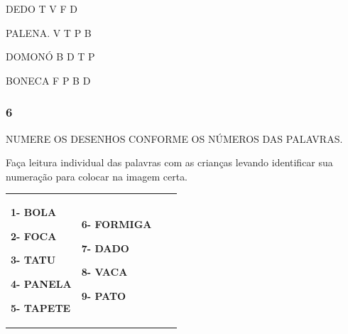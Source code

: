 DEDO T V F D

PALENA. V T P B

DOMONÓ B D T P

BONECA F P B D

\subsubsection{6 }\label{section-5}

NUMERE OS DESENHOS CONFORME OS NÚMEROS DAS PALAVRAS.

Faça leitura individual das palavras com as crianças levando identificar
sua numeração para colocar na imagem certa.

\begin{longtable}[]{@{}llll@{}}
\toprule
\begin{minipage}[b]{0.24\columnwidth}\raggedright\strut
\textbf{1- BOLA}

\textbf{2- FOCA}

\textbf{3- TATU}

\textbf{4- PANELA}

\textbf{5- TAPETE}\strut
\end{minipage} & \begin{minipage}[b]{0.24\columnwidth}\raggedright\strut
\textbf{6- FORMIGA}

\textbf{7- DADO}

\textbf{8- VACA}

\textbf{9- PATO}


\end{minipage}
\end{longtable}
